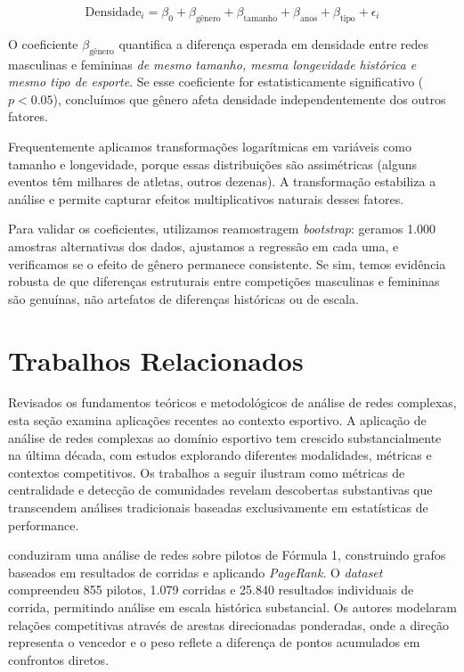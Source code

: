 \begin{equation}
\text{Densidade}_i = \beta_0 + \beta_{\text{gênero}} + \beta_{\text{tamanho}} + \beta_{\text{anos}} + \beta_{\text{tipo}} + \epsilon_i
\end{equation}

\noindent O coeficiente $\beta_{\text{gênero}}$ quantifica a diferença esperada em densidade entre redes masculinas e femininas \textit{de mesmo tamanho, mesma longevidade histórica e mesmo tipo de esporte}. Se esse coeficiente for estatisticamente significativo ($p < 0.05$), concluímos que gênero afeta densidade independentemente dos outros fatores.

Frequentemente aplicamos transformações logarítmicas em variáveis como tamanho e longevidade, porque essas distribuições são assimétricas (alguns eventos têm milhares de atletas, outros dezenas). A transformação estabiliza a análise e permite capturar efeitos multiplicativos naturais desses fatores.

Para validar os coeficientes, utilizamos reamostragem \textit{bootstrap}: geramos 1.000 amostras alternativas dos dados, ajustamos a regressão em cada uma, e verificamos se o efeito de gênero permanece consistente. Se sim, temos evidência robusta de que diferenças estruturais entre competições masculinas e femininas são genuínas, não artefatos de diferenças históricas ou de escala.

\section{Trabalhos Relacionados}

Revisados os fundamentos teóricos e metodológicos de análise de redes complexas, esta seção examina aplicações recentes ao contexto esportivo. A aplicação de análise de redes complexas ao domínio esportivo tem crescido substancialmente na última década, com estudos explorando diferentes modalidades, métricas e contextos competitivos. Os trabalhos a seguir ilustram como métricas de centralidade e detecção de comunidades revelam descobertas substantivas que transcendem análises tradicionais baseadas exclusivamente em estatísticas de performance.

 conduziram uma análise de redes sobre pilotos de Fórmula 1, construindo grafos baseados em resultados de corridas e aplicando \textit{PageRank}{}. O \textit{dataset} compreendeu 855 pilotos, 1.079 corridas e 25.840 resultados individuais de corrida, permitindo análise em escala histórica substancial. Os autores modelaram relações competitivas através de arestas direcionadas ponderadas, onde a direção representa o vencedor e o peso reflete a diferença de pontos acumulados em confrontos diretos.


